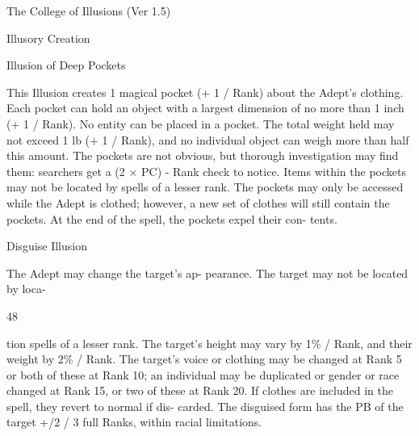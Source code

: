 \begin{Chapter}{The College of Illusions (Ver 1.5)}
\begin{spell}[S-3]{Illusory Creation }
\begin{effects}
\end{effects}
\end{spell}

\begin{spell}[S-4]{Illusion of Deep Pockets }

\begin{effects}
This Illusion creates 1 magical pocket (+ 1 
/  Rank)  about  the  Adept’s  clothing.  Each  pocket 
can  hold  an  object  with  a  largest  dimension  of  no 
more  than  1  inch  (+  1  /  Rank).  No  entity  can  be 
placed  in  a  pocket.  The  total  weight  held  may  not 
exceed 1 lb (+ 1 / Rank), and no individual object 
can weigh more than half this amount. The pockets 
are  not  obvious,  but  thorough  investigation  may 
find them: searchers get a (2 × PC) - Rank check to 
notice. Items within the pockets may not be located 
by spells of a lesser rank. The pockets may only be 
accessed  while  the  Adept  is  clothed;  however,  a 
new set of clothes will still contain the pockets. At 
the  end  of  the  spell,  the  pockets  expel  their  con-
tents. 

\end{effects}
\end{spell}

\begin{spell}[S-5]{Disguise Illusion }

\begin{effects}
 The  Adept  may  change  the  target’s  ap-
pearance.  The  target  may  not  be  located  by  loca-

48 

tion spells of a lesser rank. The target’s height may 
vary by 1\% / Rank, and their weight by 2\% / Rank. 
The  target’s  voice  or  clothing  may  be  changed  at 
Rank 5  or  both  of  these  at Rank 10; an individual 
may  be  duplicated  or  gender  or  race  changed  at 
Rank 15, or two of these at Rank 20. If clothes are 
included  in  the  spell,  they  revert  to  normal  if  dis-
carded. The disguised form has the PB of the target 
+/2 / 3 full Ranks, within racial limitations. 

\end{effects}
\end{spell}


\end{Chapter}
